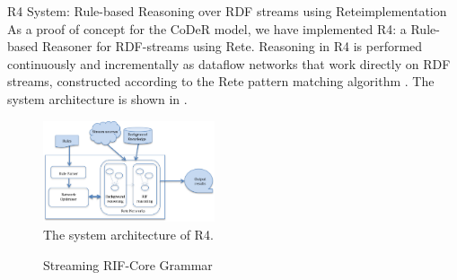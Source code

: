 \begin{nestedsection}{R4 System: Rule-based Reasoning over RDF streams using Rete}{implementation}
	As a proof of concept for the CoDeR model, we have implemented R4: a Rule-based Reasoner for RDF-streams using Rete.
	Reasoning in R4 is performed continuously and incrementally as dataflow networks that work directly on RDF streams, constructed according to the Rete pattern matching algorithm \citep{forgy79}.
	The system architecture is shown in .
	\begin{figure}[b]
		\centering
		\includegraphics[width=0.45\textwidth]{R4-architecture.png}
		\caption{The system architecture of R4.}
	\end{figure}

	\begin{figure}[t]
		\centering
		\begin{ebnf}
		\end{ebnf}
		\caption{Streaming RIF-Core Grammar}
	\end{figure}


\end{nestedsection}
